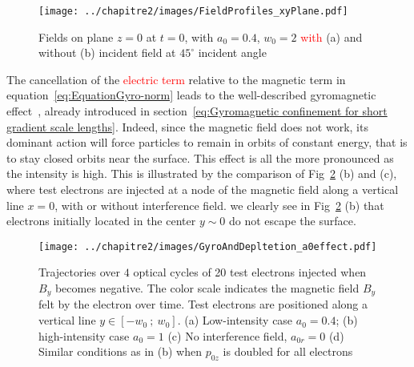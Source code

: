 \begin{figure}[H]
\begin{center}
\texttt{[image: ../chapitre2/images/FieldProfiles\_xyPlane.pdf]}
\end{center}
\caption{\label{fig:FieldProfiles_xyPlane} Fields  on plane $z=0$ at $t = 0$, with $a_0 = 0.4$, $w_0 = 2$ \textcolor{red}{with} (a) and without (b) incident field at $45^{\circ}$ incident angle}
\end{figure}



\noindent The cancellation of the \textcolor{red}{electric term} relative to the magnetic term in equation~\ref{eq:EquationGyro-norm} leads to the well-described gyromagnetic effect~\cite{geindre2006relativistic}, already introduced in section~\ref{eq:Gyromagnetic confinement for short gradient scale lengths}. Indeed, since the magnetic field does not work, its dominant action will force particles to remain in orbits of constant energy, that is to stay closed orbits near the surface. This effect is all the more pronounced as the intensity is high. This is illustrated by the comparison of Fig~\ref{fig:GyroAndDepltetion_a0effect} (b) and (c), where test electrons are injected at a node of the magnetic field along a vertical line $x=0$, with or without interference field. we clearly see in Fig~\ref{fig:GyroAndDepltetion_a0effect} (b) that electrons initially located in the center $y\sim 0$ do not escape the surface.


\begin{figure}[H]
\centering
\texttt{[image: ../chapitre2/images/GyroAndDepltetion\_a0effect.pdf]}\\
\caption{\label{fig:GyroAndDepltetion_a0effect} Trajectories over $4$ optical cycles of 20 test electrons injected when $B_y$ becomes negative. The color scale indicates the magnetic field $B_y$ felt by the electron over time. Test electrons are positioned along a vertical line $y\in [-w_0 \ ; \ w_0]$. (a) Low-intensity case $a_0 = 0.4$; (b) high-intensity case $a_0 =1$ (c) No interference field, $a_{0r} = 0$ (d) Similar conditions as in (b) when $p_{0z}$ is doubled for all electrons}
\end{figure}









%
%


